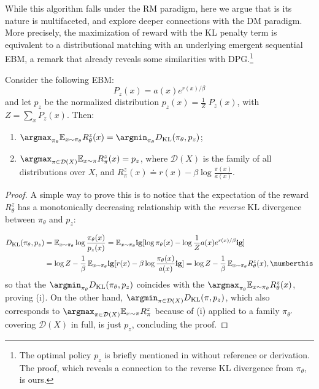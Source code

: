 While this algorithm falls under the RM paradigm, here we argue that is its nature is multifaceted, and explore deeper connections with the DM paradigm. More precisely, the maximization of reward with the KL penalty term is equivalent to a distributional matching with an underlying emergent sequential EBM, a remark that already reveals some similarities with DPG.\footnote{The optimal policy $p_z$ is briefly mentioned in \citep{Ziegler19} without reference or derivation. The proof, which reveals a connection to the reverse KL divergence from ${\pi_\theta}$,
is ours.}

\begin{theorem}
\label{theorem_kl}
Consider the following EBM:
\begin{equation}
   P_z(x) = a(x)e^{r(x)/\beta} \label{eq:Ziegler_optimal}
\end{equation}
and let $p_z$ be the normalized distribution $p_z(x)  = \frac{1}{Z}\;  P_z(x)$, with $Z=\sum_x P_z(x)$. Then: 
\begin{enumerate}[itemsep=0pt, label=(\roman*)]

    \item $\argmax_{\pi_\theta} \mathbb{E}_{x \sim {\pi_\theta}} R^z_\theta(x) = \argmin_{\pi_\theta} D_{\mathrm{KL}}({\pi_\theta}, p_z)$;
    \item $\argmax_{\pi \in \mathcal{D}(X)} \mathbb{E}_{x \sim \pi} R^z_\pi(x) = p_z$, where $\mathcal{D}(X)$ is the family of all distributions over $X$, and $R^z_\pi(x) \doteq r(x) - \beta \log \frac{\pi(x)}{a(x)}$.
\end{enumerate}

\end{theorem}

\begin{proof}
A simple way to prove  this is to notice that the expectation of the reward $R^z_\theta$ 
has a monotonically decreasing relationship with the \emph{reverse} KL divergence between ${\pi_\theta}$ and $p_z$:

\begin{align*}
        D_{\mathrm{KL}}({\pi_\theta}, p_z) &= \mathbb{E}_{x \sim {\pi_\theta}} \log \frac{{\pi_\theta}(x)}{p_z(x)}
    = \mathbb{E}_{x \sim {\pi_\theta}} \mathbf{ig}[\log {\pi_\theta}(x) - \log \frac{1}{Z} a(x)e^{r(x)/\beta}\mathbf{ig}] \\
    &= \log Z - \frac{1}{\beta}\, \mathbb{E}_{x \sim {\pi_\theta}} \mathbf{ig}[r(x) -\beta \log \frac{{\pi_\theta}(x)}{a(x)}  \mathbf{ig}] = \log Z - \frac{1}{\beta}\, \mathbb{E}_{x \sim {\pi_\theta}} R^z_\theta(x), \numberthis \label{eq:klrmax}
\end{align*}
so that the $\argmin_{\pi_\theta} D_{\mathrm{KL}}({\pi_\theta}, p_z)$ coincides with the $\argmax_{\pi_\theta} \mathbb{E}_{x \sim {\pi_\theta}} R^z_\theta(x)$, proving (i). On the other hand, $\argmin_{\pi \in \mathcal{D}(X)} D_{\mathrm{KL}}(\pi, p_z)$, which also corresponds to $\argmax_{\pi \in \mathcal{D}(X)} \mathbb{E}_{x \sim \pi} R^z_\pi$ because of (i) applied to a family $\pi_{\theta'}$ covering $\mathcal{D}(X)$ in full, is just $p_z$, concluding the proof.

\end{proof}

